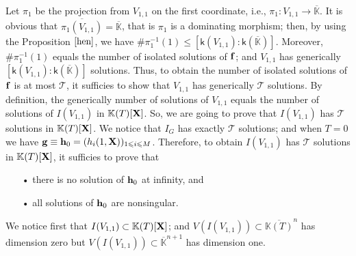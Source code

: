 \documentclass[11pt]{article}
\numberwithin{Property}{section}
\numberwithin{Theorem}{section}
\numberwithin{Proposition}{section}
\numberwithin{Lemma}{section}
\numberwithin{Corollary}{section}
\numberwithin{Definition}{section}
\numberwithin{Remark}{section}
\numberwithin{Conjecture}{section}
\numberwithin{Problem}{section}
\numberwithin{Claim}{section}
\theoremstyle{definition}
\numberwithin{Example}{section}
\renewcommand{\leq}{\leqslant}
\def\bar{\overline}
\newcommand{\field}{\mathbb{K}} %
\newcommand{\mat}[1]{\mathbf{\MakeUppercase{#1}}} %
\begin{document}
Let $\pi_1$ be the projection from $V_{1,1}$ on the first coordinate, i.e., $\pi_1: V_{1,1} \to \bar{\field}$. It is obvious that $\bar{\pi_1(V_{1,1})} = \bar{\field}$, that is $\pi_1$ is a dominating morphism; then, by using the Proposition $\ref{hen}$, we have $\#\pi_1^{-1}(1) \leq [ \mathsf{k}(V_{1,1}) : \mathsf{k}(\bar{\field})]$. Moreover, $\#\pi_1^{-1}(1)$ equals the number of isolated solutions of ${\bf f}$; and $V_{1,1}$ has generically $[ \mathsf{k}(V_{1,1}) : \mathsf{k}(\bar{\field})]$ solutions. Thus, to obtain the number of isolated solutions of ${\bf f}$ is at most $\mathcal{T}$, it sufficies to show that $V_{1,1}$ has generically $\mathcal{T}$ solutions. By definition, the generically number of solutions of $V_{1,1}$ equals the number of solutions of $I(V_{1,1})$ in $\field(T)[\mat{X}]$. So, we are going to prove that $I(V_{1,1})$ has $\mathcal{T}$ solutions in $\field(T)[\mat{X}]$. We notice that $I_G$ has exactly $\mathcal{T}$ solutions; and when $T = 0$ we have ${\bf g} \equiv  {\bf h}_0 = (h_{i}(1, \mat{X}))_{1 \leq i \leq M}$. Therefore, to obtain $I(V_{1,1})$ has $\mathcal{T}$ solutions in $\field(T)[\mat{X}]$, it sufficies to prove that 
\begin{itemize}
\item[•] there is no solution of ${\bf h}_0$ at infinity, and 
\item[•] all solutions of ${\bf h}_0$ are nonsingular. 
\end{itemize}

We notice first that $I(V_{1,1}) \subset \field(T)[\mat{X}]$; and $V(I(V_{1,1})) \subset \bar{\field(T)}^n$ has dimension zero but $V(I(V_{1,1})) \subset \bar{\field}^{n+1}$ has dimension one. 
\end{document}
